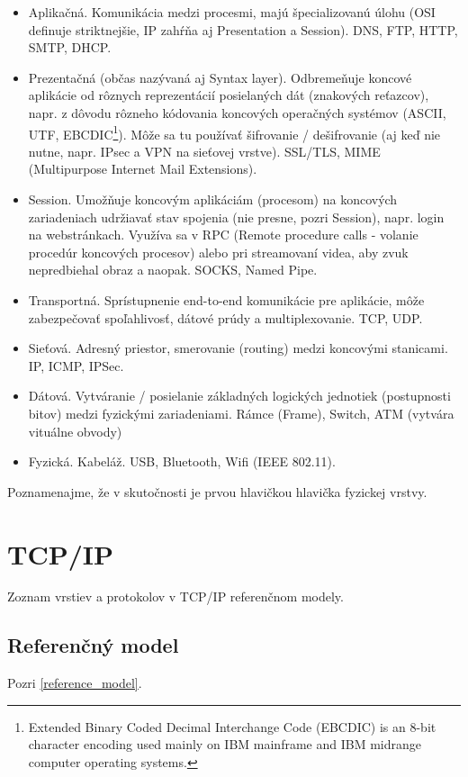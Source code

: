 \documentclass[10pt,a4paper]{article}
\begin{document}
\begin{itemize}
\item Aplikačná. Komunikácia medzi procesmi, majú špecializovanú úlohu (OSI definuje striktnejšie, IP zahŕňa aj Presentation a Session). DNS, FTP, HTTP, SMTP, DHCP. 
\item Prezentačná (občas nazývaná aj Syntax layer). Odbremeňuje koncové aplikácie od rôznych reprezentácií posielaných dát (znakových reťazcov),
napr. z dôvodu rôzneho kódovania koncových operačných systémov (ASCII, UTF, EBCDIC\footnote{
Extended Binary Coded Decimal Interchange Code (EBCDIC) is an 8-bit character encoding used mainly on IBM mainframe and IBM midrange computer operating systems.
}). Môže sa tu používať šifrovanie / dešifrovanie (aj keď nie nutne, napr. IPsec a VPN na sieťovej vrstve). SSL/TLS, MIME (Multipurpose Internet Mail Extensions).        
\item Session. Umožňuje koncovým aplikáciám (procesom) na koncových zariadeniach udržiavať stav spojenia (nie presne, pozri Session), napr. login na webstránkach. Využíva sa v RPC (Remote procedure calls - volanie procedúr koncových procesov) alebo pri streamovaní videa, aby zvuk nepredbiehal obraz a naopak. SOCKS, Named Pipe. 
\item Transportná. Sprístupnenie end-to-end komunikácie pre aplikácie, môže zabezpečovať spoľahlivosť, dátové prúdy a multiplexovanie. TCP, UDP.                    
\item Sieťová. Adresný priestor, smerovanie (routing) medzi koncovými stanicami. IP, ICMP, IPSec. 
\item Dátová. Vytváranie / posielanie základných logických jednotiek (postupnosti bitov) medzi fyzickými zariadeniami. Rámce (Frame), Switch, ATM (vytvára vituálne obvody)
\item Fyzická. Kabeláž. USB, Bluetooth, Wifi (IEEE 802.11).
\end{itemize}

Poznamenajme, že v skutočnosti je prvou hlavičkou hlavička fyzickej vrstvy. 
                  
\section{TCP/IP}       
Zoznam vrstiev a protokolov v TCP/IP referenčnom modely. 
   
\subsection{Referenčný model}        
Pozri \ref{reference_model}.
\end{document}
